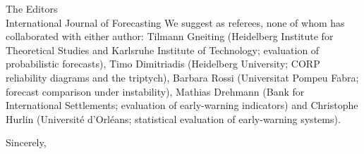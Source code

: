 \documentclass[11pt]{letter}
\begin{document}
\begin{letter}{The Editors\\International Journal of Forecasting}
We suggest as referees, none of whom has collaborated with either author: Tilmann Gneiting (Heidelberg Institute for Theoretical Studies and Karlsruhe Institute of Technology; evaluation of probabilistic forecasts), Timo Dimitriadis (Heidelberg University; CORP reliability diagrams and the triptych), Barbara Rossi (Universitat Pompeu Fabra; forecast comparison under instability), Mathias Drehmann (Bank for International Settlements; evaluation of early-warning indicators) and Christophe Hurlin (Universit\'e d'Orl\'eans; statistical evaluation of early-warning systems).
\closing{Sincerely,}
\end{letter}
\end{document}
